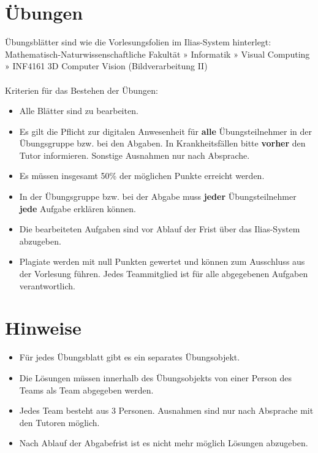 \documentclass[a4paper,oneside,11pt,DIV=14]{scrartcl}
\begin{document}
\deckblatt

\section*{Übungen}

Übungsblätter sind wie die Vorlesungsfolien im Ilias-System hinterlegt:\\ 
{Mathematisch-Naturwissenschaftliche Fakultät » Informatik » Visual Computing » INF4161 3D Computer Vision (Bildverarbeitung II)}\
\\\\
Kriterien für das Bestehen der Übungen:
\begin{itemize}
\item Alle Blätter sind zu bearbeiten.
\item Es gilt die Pflicht zur digitalen Anwesenheit für \textbf{alle} Übungsteilnehmer in der Übungsgruppe bzw. bei den Abgaben. In Krankheitsfällen bitte \textbf{vorher} den Tutor informieren. Sonstige Ausnahmen nur nach Absprache.
\item Es müssen insgesamt 50\% der möglichen Punkte erreicht werden.
\item In der Übungsgruppe bzw. bei der Abgabe muss \textbf{jeder} Übungsteilnehmer \textbf{jede} Aufgabe erklären können.
\item Die bearbeiteten Aufgaben sind vor Ablauf der Frist über das Ilias-System abzugeben.
\item Plagiate werden mit null Punkten gewertet und können zum Ausschluss aus der Vorlesung führen. Jedes Teammitglied ist für alle abgegebenen Aufgaben verantwortlich.
\end{itemize}

\section*{Hinweise}
\begin{itemize}
\item Für jedes Übungsblatt gibt es ein separates Übungsobjekt.
\item Die Lösungen müssen innerhalb des Übungsobjekts von einer Person des Teams als Team abgegeben werden.
\item Jedes Team besteht aus 3 Personen. Ausnahmen sind nur nach Absprache mit den Tutoren möglich.
\item Nach Ablauf der Abgabefrist ist es nicht mehr möglich Lösungen abzugeben.
\end{itemize}
\end{document}
